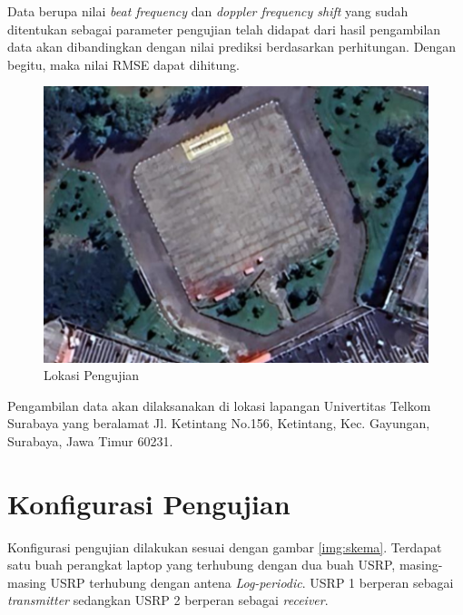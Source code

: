 Data berupa nilai \textit{beat frequency} dan \textit{doppler frequency shift} yang sudah ditentukan sebagai parameter pengujian telah didapat dari hasil pengambilan data akan dibandingkan dengan nilai prediksi berdasarkan perhitungan. Dengan begitu, maka nilai RMSE dapat dihitung.

\begin{figure}
	\begin{center}
		\includegraphics[scale=0.35]{pics/bab3/petaPengujian.png}
		\caption{Lokasi Pengujian}
		\label{img:petaUji}
	\end{center}
\end{figure}

Pengambilan data akan dilaksanakan di lokasi lapangan Univertitas Telkom Surabaya yang beralamat Jl. Ketintang No.156, Ketintang, Kec. Gayungan, Surabaya, Jawa Timur 60231.

\section{Konfigurasi Pengujian}
Konfigurasi pengujian dilakukan sesuai dengan gambar \ref{img:skema}. Terdapat satu buah perangkat laptop yang terhubung dengan dua buah USRP, masing-masing USRP terhubung dengan antena \textit{Log-periodic}. USRP 1 berperan sebagai \textit{transmitter} sedangkan USRP 2 berperan sebagai \textit{receiver}.

